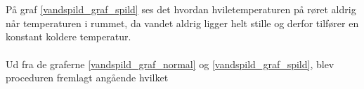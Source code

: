 \\
\\
På graf \ref{vandspild_graf_spild} ses det hvordan hviletemperaturen på røret aldrig når temperaturen i rummet, da vandet aldrig ligger helt stille og derfor tilfører en konstant koldere temperatur.
\\
\\
Ud fra de graferne \ref{vandspild_graf_normal} og \ref{vandspild_graf_spild}, blev proceduren fremlagt angående hvilket  